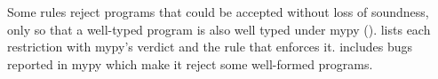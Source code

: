 Some rules reject programs that could be accepted without loss of soundness, only so that a well-typed program is
also well typed under mypy ().  lists each restriction with mypy's
verdict and the rule that enforces it.  includes bugs reported in mypy which
make it reject some well-formed programs.




\FloatBarrier
